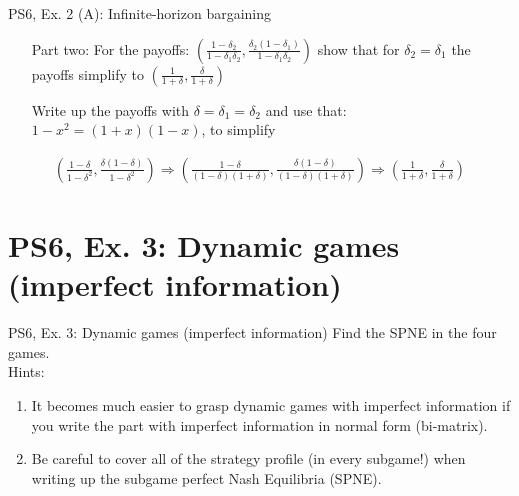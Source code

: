 \begin{frame}{PS6, Ex. 2 (A): Infinite-horizon bargaining}
    \begin{itemize}
    \item[Part two:] For the payoffs: $ \left( \frac{1-\delta_2}{1-\delta_1\delta_2},\frac{\delta_2(1-\delta_1)}{1-\delta_1\delta_2}\right)$ show that for $\delta_2=\delta_1$ the payoffs simplify to $\left(\frac{1}{1+\delta},\frac{\delta}{1+\delta}\right)$
    \end{itemize}
    \vfill\null
    \begin{itemize}
    \item[]Write up the payoffs with $\delta=\delta_1=\delta_2$ and use that: $1-x^2=(1+x)(1-x)$, to simplify \\
    \end{itemize}
    \vfill\null
    \begin{align*}
\left(\frac{1-\delta}{1-\delta^2},\frac{\delta(1-\delta)}{1-\delta^2}\right) \Rightarrow \left(\frac{1-\delta}{(1-\delta)(1+\delta)},\frac{\delta(1-\delta)}{(1-\delta)(1+\delta)}\right) \Rightarrow \left(\frac{1}{1+\delta},\frac{\delta}{1+\delta}\right)
    \end{align*}
    \vfill\null
\end{frame}

\section{PS6, Ex. 3: Dynamic games (imperfect information)}

\begin{frame}{PS6, Ex. 3: Dynamic games (imperfect information)}
    Find the SPNE in the four games.\\\bigskip
    Hints:
    \begin{enumerate}
      \item It becomes much easier to grasp dynamic games with imperfect information if you write the part with imperfect information in normal form (bi-matrix).
      \item Be careful to cover all of the strategy profile (in every subgame!) when writing up the subgame perfect Nash Equilibria (SPNE).
    \end{enumerate}
    \vfill\null
\end{frame}


